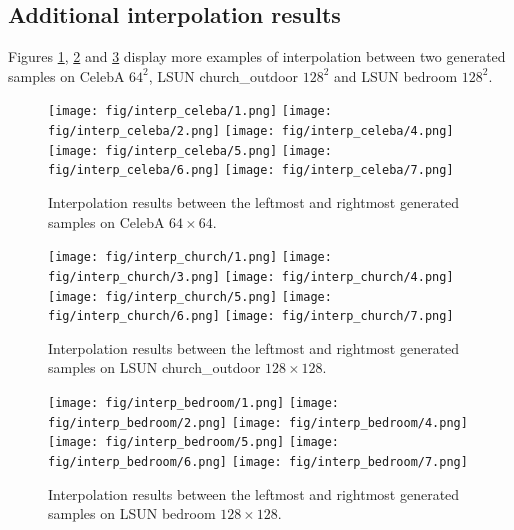 \documentclass{article} \usepackage{iclr2021_conference,times}
\begin{document}
\subsection{Additional interpolation results} \label{app:interp}
Figures \ref{fig: interp-celeba}, \ref{fig: interp-church} and \ref{fig: interp-bedroom} display more examples of interpolation between two generated samples on CelebA $64^2$, LSUN church\_outdoor $128^2$ and LSUN bedroom $128^2$.
\begin{figure}[ht]
\begin{center}
\texttt{[image: fig/interp\_celeba/1.png]}
\texttt{[image: fig/interp\_celeba/2.png]}
\texttt{[image: fig/interp\_celeba/4.png]}
\texttt{[image: fig/interp\_celeba/5.png]}
\texttt{[image: fig/interp\_celeba/6.png]}
\texttt{[image: fig/interp\_celeba/7.png]}
\end{center}
\caption{Interpolation results between the leftmost and rightmost generated samples on CelebA $64 \times 64$. }
\label{fig: interp-celeba}
\end{figure}
\begin{figure}[ht]
\begin{center}
\texttt{[image: fig/interp\_church/1.png]}
\texttt{[image: fig/interp\_church/3.png]}
\texttt{[image: fig/interp\_church/4.png]}
\texttt{[image: fig/interp\_church/5.png]}
\texttt{[image: fig/interp\_church/6.png]}
\texttt{[image: fig/interp\_church/7.png]}
\end{center}
\caption{Interpolation results between the leftmost and rightmost generated samples on LSUN church\_outdoor $128 \times 128$. }
\label{fig: interp-church}
\end{figure}

\begin{figure}[ht]
\begin{center}
\texttt{[image: fig/interp\_bedroom/1.png]}
\texttt{[image: fig/interp\_bedroom/2.png]}
\texttt{[image: fig/interp\_bedroom/4.png]}
\texttt{[image: fig/interp\_bedroom/5.png]}
\texttt{[image: fig/interp\_bedroom/6.png]}
\texttt{[image: fig/interp\_bedroom/7.png]}
\end{center}
\caption{Interpolation results between the leftmost and rightmost generated samples on LSUN bedroom $128 \times 128$. }
\label{fig: interp-bedroom}
\end{figure}
\end{document}
